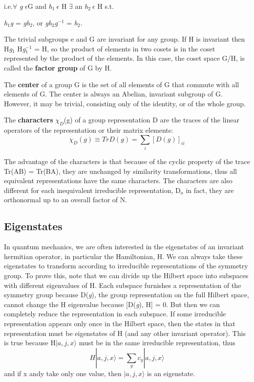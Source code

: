 i.e.$\forall$ \textit{g} $\epsilon$G and \textit{h}$_1 \: \epsilon$ H $\exists$ an \textit{h}$_2 \: \epsilon$ H s.t.
\begin{center}
    \textit{h}$_1$\textit{g} = \textit{gh}$_2$, or \textit{gh}$_2$\textit{g}$^{-1}$ = \textit{h}$_2$.
\end{center} 

The trivial subgroups e and G are invariant for any group. If H is invariant then H\textit{g}$_1$ H\textit{g}$_1^{-1}$ = H, 
so the product of elements in two cosets is in the coset represented by the product of the elements. 
In this case, the coset space G/H, is called the \textbf{factor group} of G by H.

The \textbf{center} of a group G is the set of all elements of G that commute
with all elements of G. The center is always an Abelian, invariant subgroup
of G. However, it may be trivial, consisting only of the identity, or of the
whole group.


The \textbf{characters} $\chi_D$(g) of a group representation D are the traces of the linear
operators of the representation or their matrix elements:
\begin{equation}
    \chi_D(g) \equiv Tr D(g) = \sum_{i}[D(g)]_{ii}
\end{equation}

The advantage of the characters is that because of the cyclic property of the trace Tr(AB) = Tr(BA), they are unchanged by similarity transformations,
thus all equivalent representations have the same characters. The characters are also different for each inequivalent irreducible representation, D$_a$\textemdash 
in fact, they are orthonormal up to an overall factor of N.

\subsection{Eigenstates}
In quantum mechanics, we are often interested in the eigenstates of an invariant hermitian operator, in particular the Hamiltonian, H. 
We can always take these eigenstates to transform according to irreducible representations of the symmetry group. 
To prove this, note that we can divide up the Hilbert space into subspaces with different eigenvalues of H. 
Each subspace furnishes a representation of the symmetry group because D(\textit{g}), the group representation on the full Hilbert space, 
cannot change the H eigenvalue because [D(\textit{g}), H] = 0. But then we can completely reduce the representation in each subspace.
If some irreducible representation appears only once in the Hilbert space, then the states in that representation must be eigenstates
of H (and any other invariant operator). This is true because H$|a, j, x\rangle$ must be in the same irreducible representation, thus
\begin{equation}
    H|a, j, x\rangle = \sum_{y} c_y |a, j, x\rangle
\end{equation}
and if x andy take only one value, then $|a, j, x\rangle$ is an eigenstate.

